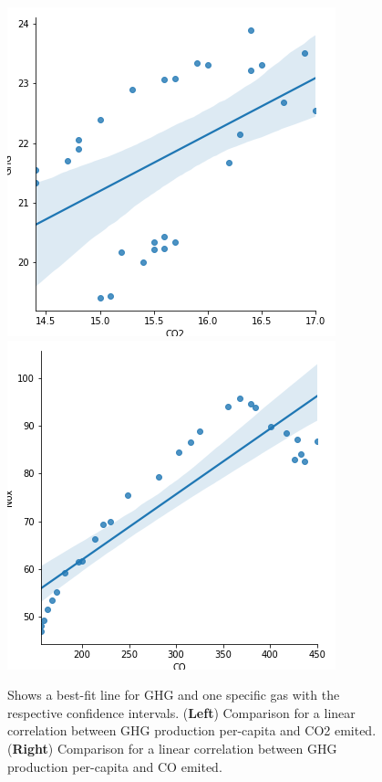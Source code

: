 \documentclass[11pt]{article}
\numberwithin{equation}{section}
\begin{document}
\begin{figure}[t]
\centering
\includegraphics[width=0.30\paperwidth, clip=true, trim=0mm 0mm 0mm 0mm]{figures/corr_CO2_GHG}
\includegraphics[width=0.30\paperwidth, clip=true, trim=0mm 0mm 0mm 0mm]{figures/corr_CO_NOX}

\caption{Shows  a best-fit line for GHG and one specific gas with the respective confidence intervals. (\textbf{Left}) Comparison for a linear correlation between GHG production per-capita and CO2  emited. (\textbf{Right}) Comparison for a linear correlation between GHG production per-capita and CO emited. 
}
\label{Example6fig}
\end{figure}
\end{document}
